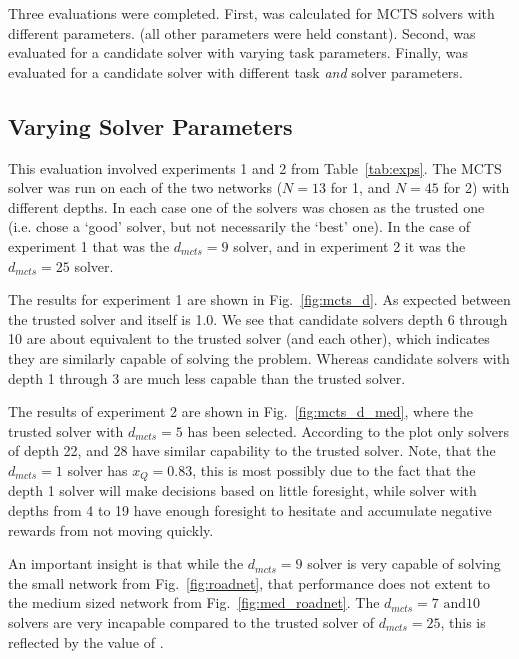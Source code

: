 Three evaluations were completed. First, \xQ{} was calculated for MCTS solvers with different parameters. (all other parameters were held constant). Second, \xQ{} was evaluated for a candidate solver with varying task parameters. Finally, \xQ{} was evaluated for a candidate solver with different task \emph{and} solver parameters.

\subsection{Varying Solver Parameters}
This evaluation involved experiments 1 and 2 from Table~\ref{tab:exps}. The MCTS solver was run on each of the two networks ($N=13$ for 1, and $N=45$ for 2) with different depths. In each case one of the solvers was chosen as the trusted one (i.e. chose a `good' solver, but not necessarily the `best' one). In the case of experiment 1 that was the $d_{mcts}=9$ solver, and in experiment 2 it was the $d_{mcts}=25$ solver.

The results for experiment 1 are shown in Fig.~\ref{fig:mcts_d}. As expected \xQ{} between the trusted solver and itself is 1.0. We see that candidate solvers depth 6 through 10 are about equivalent to the trusted solver (and each other), which indicates they are similarly capable of solving the problem. Whereas candidate solvers with depth 1 through 3 are much less capable than the trusted solver.

The results of experiment 2 are shown in Fig.~\ref{fig:mcts_d_med}, where the trusted solver with $d_{mcts}=5$ has been selected. According to the plot only solvers of depth 22, and 28 have similar capability to the trusted solver. Note, that the $d_{mcts}=1$ solver has $x_Q=0.83$, this is most possibly due to the fact that the depth 1 solver will make decisions based on little foresight, while solver with depths from 4 to 19 have enough foresight to hesitate and accumulate negative rewards from not moving quickly.

An important insight is that while the $d_{mcts}=9$ solver is very capable of solving the small network from Fig.~\ref{fig:roadnet}, that performance does not extent to the medium sized network from Fig.~\ref{fig:med_roadnet}. The $d_{mcts}=7 \text{ and} 10$ solvers are very incapable compared to the trusted solver of $d_{mcts}=25$, this is reflected by the value of \xQ.

